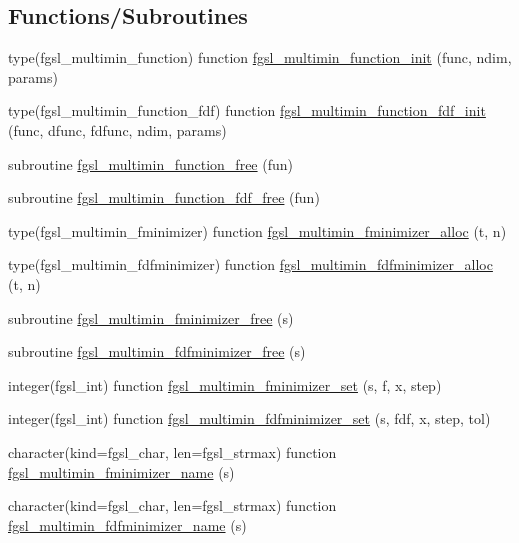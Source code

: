 \subsection*{Functions/\+Subroutines}
\begin{DoxyCompactItemize}
\item 
type(fgsl\+\_\+multimin\+\_\+function) function \hyperlink{multimin_8finc_a1b777bbc4aa79d172caa92121222b5db}{fgsl\+\_\+multimin\+\_\+function\+\_\+init} (func, ndim, params)
\item 
type(fgsl\+\_\+multimin\+\_\+function\+\_\+fdf) function \hyperlink{multimin_8finc_a38c9b041ca068595cd096fb565b8b84b}{fgsl\+\_\+multimin\+\_\+function\+\_\+fdf\+\_\+init} (func, dfunc, fdfunc, ndim, params)
\item 
subroutine \hyperlink{multimin_8finc_a20359c7761d29e39ee1edbb1a7499814}{fgsl\+\_\+multimin\+\_\+function\+\_\+free} (fun)
\item 
subroutine \hyperlink{multimin_8finc_acf20d19ee20fdd349f2cb779761e15dd}{fgsl\+\_\+multimin\+\_\+function\+\_\+fdf\+\_\+free} (fun)
\item 
type(fgsl\+\_\+multimin\+\_\+fminimizer) function \hyperlink{multimin_8finc_a9572fe1c742b37999c9dfff7a0ca7ca9}{fgsl\+\_\+multimin\+\_\+fminimizer\+\_\+alloc} (t, n)
\item 
type(fgsl\+\_\+multimin\+\_\+fdfminimizer) function \hyperlink{multimin_8finc_a4e93d6fb4c774ef02bc0e256fc74f3cf}{fgsl\+\_\+multimin\+\_\+fdfminimizer\+\_\+alloc} (t, n)
\item 
subroutine \hyperlink{multimin_8finc_ab3a786c5c952d55af8c14d3197682c50}{fgsl\+\_\+multimin\+\_\+fminimizer\+\_\+free} (s)
\item 
subroutine \hyperlink{multimin_8finc_a87a418eae01978bd53b1b3d120bd7808}{fgsl\+\_\+multimin\+\_\+fdfminimizer\+\_\+free} (s)
\item 
integer(fgsl\+\_\+int) function \hyperlink{multimin_8finc_acb48fd9d43a274bac09933d5600439bf}{fgsl\+\_\+multimin\+\_\+fminimizer\+\_\+set} (s, f, x, step)
\item 
integer(fgsl\+\_\+int) function \hyperlink{multimin_8finc_a48d15a5b27f8afaf450743f443a6b4e0}{fgsl\+\_\+multimin\+\_\+fdfminimizer\+\_\+set} (s, fdf, x, step, tol)
\item 
character(kind=fgsl\+\_\+char, len=fgsl\+\_\+strmax) function \hyperlink{multimin_8finc_ac0081b18d8d21a731ab07186254e6421}{fgsl\+\_\+multimin\+\_\+fminimizer\+\_\+name} (s)
\item 
character(kind=fgsl\+\_\+char, len=fgsl\+\_\+strmax) function \hyperlink{multimin_8finc_add7aec7d233afa06b916d2b936274c41}{fgsl\+\_\+multimin\+\_\+fdfminimizer\+\_\+name} (s)

\end{DoxyCompactItemize}
